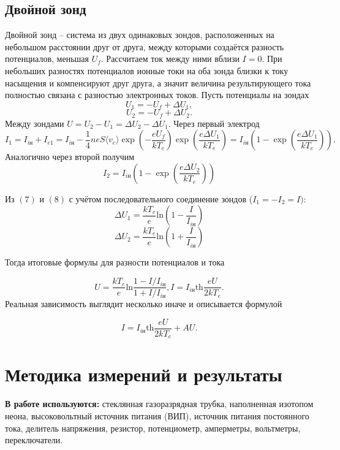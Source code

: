 \documentclass[12pt, a4paper]{article}
\begin{document}
\subsection*{Двойной зонд}
Двойной зонд -- система из двух одинаковых зондов, расположенных на небольшом расстоянии друг от друга, между которыми создаётся разность потенциалов, меньшая $U_f$. Рассчитаем ток между ними вблизи $I=0$. При небольших разностях потенциалов ионные токи на оба зонда близки к току насыщения и компенсируют друг друга, а значит величина результирующего тока полностью связана с разностью электронных токов. Пусть потенциалы на зондах
$$
U_1 = -U_f + \Delta U_1,
$$
$$
U_2 = -U_f + \Delta U_2.
$$
Между зондами $U = U_2 - U_1 = \Delta U_2 - \Delta U_1$.
Через первый электрод
\begin{equation}
I_1 = I_{i\text{н}} + I_{e1} = I_{i\text{н}} - \dfrac{1}{4}neS\langle v_e\rangle \exp\left(-\dfrac{eU_f}{kT_e}\right)\exp\left(\dfrac{e\Delta U_1}{kT_e}\right)=I_{i\text{н}}\left(1 - \exp\left( \dfrac{e\Delta U_1}{kT_e} \right)\right).
\end{equation}
Аналогично через второй получим
\begin{equation}
I_2 = I_{i\text{н}}\left(1 - \exp\left( \dfrac{e\Delta U_2}{kT_e} \right)\right)
\end{equation}
  
Из $(7)$ и $(8)$ с учётом последовательного соединение зондов ($I_1 = -I_2 = I)$:
$$
\Delta U_1= \dfrac{kT_e}{e}\text{ln}\left(1 - \dfrac{I}{I_{i\text{н}}}\right)
$$
$$
\Delta U_2= \dfrac{kT_e}{e}\text{ln}\left(1 + \dfrac{I}{I_{i\text{н}}}\right)
$$

Тогда итоговые формулы для разности потенциалов и тока

\begin{equation}
U = \dfrac{kT_e}{e}\text{ln}\dfrac{1 - I/I_{i\text{н}}}{1 + I/I_{i\text{н}}}, 
I = I_{i\text{н}} \text{th}\dfrac{eU}{2kT_e}.
\end{equation}
Реальная зависимость выглядит несколько иначе и описывается формулой 


\begin{equation}
I = I_{i\text{н}} \text{th}\dfrac{eU}{2kT_e} + AU.
\end{equation}


\section{Методика измерений и результаты}
\textbf{В работе используются:} стеклянная газоразрядная трубка, наполненная изотопом неона, высоковольтный источник питания (ВИП), источник питания постоянного тока, делитель напряжения, резистор, потенциометр, амперметры, вольтметры, переключатели.
\end{document}
